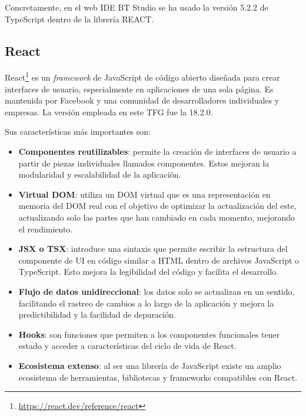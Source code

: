 Concretamente, en el web IDE BT Studio se ha usado la versión 5.2.2 de TypeScript dentro de la librería REACT. 
\subsection{React}

React\footnote{\url{https://react.dev/reference/react}} es un \textit{framework} de JavaScript de código abierto diseñada para crear interfaces de usuario, especialmente en aplicaciones de una sola página. Es mantenida por Facebook y una comunidad de desarrolladores individuales y empresas. La versión empleada en este TFG fue la 18.2.0. 

Sus características más importantes son: 

\begin{itemize}
    \item \textbf{Componentes reutilizables}: permite la creación de interfaces de usuario a partir de piezas individuales llamados componentes. Estos mejoran la modularidad y escalabilidad de la aplicación.
    
    \item \textbf{Virtual DOM}: utiliza un DOM virtual que es una representación en memoria del DOM real con el objetivo de optimizar la actualización del este, actualizando solo las partes que han cambiado en cada momento, mejorando el rendimiento.
    
    \item \textbf{JSX o TSX}: introduce una sintaxis que permite escribir la estructura del componente de UI en código similar a HTML dentro de archivos JavaScript o TypeScript. Esto mejora la legibilidad del código y facilita el desarrollo. 
    
    \item \textbf{Flujo de datos unidireccional}: los datos solo se actualizan en un sentido, facilitando el rastreo de cambios a lo largo de la aplicación y mejora la predictibilidad y la facilidad de depuración.
    
    \item \textbf{Hooks}: son funciones que permiten a los componentes funcionales tener estado y acceder a características del ciclo de vida de React.
    
    \item \textbf{Ecosistema extenso}: al ser una librería de JavaScript existe un amplio ecosistema de herramientas, bibliotecas y frameworks compatibles con React.
\end{itemize}

